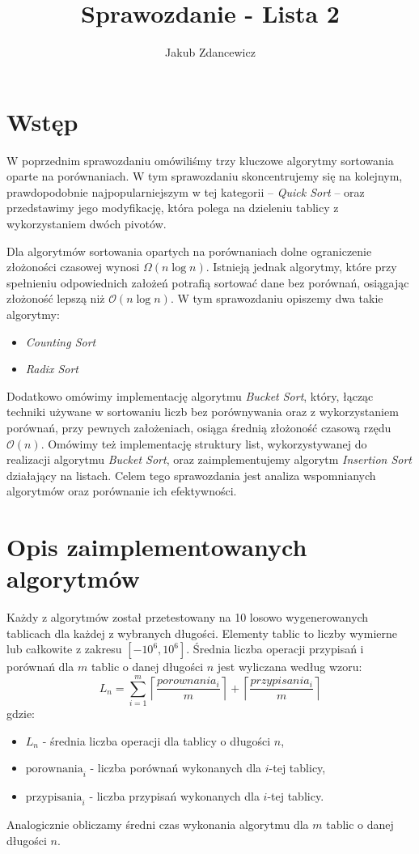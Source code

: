\documentclass{article}
\title{Sprawozdanie - Lista 2}
\author{Jakub Zdancewicz}
\date{}
\newcommand{\bigO}{\mathcal{O}}
\begin{document}
\maketitle

\tableofcontents
\newpage

\section{Wstęp}
W poprzednim sprawozdaniu omówiliśmy trzy kluczowe algorytmy sortowania oparte na porównaniach. W tym sprawozdaniu skoncentrujemy się na kolejnym, prawdopodobnie najpopularniejszym w tej kategorii – \textit{Quick Sort} – oraz przedstawimy jego modyfikację, która polega na dzieleniu tablicy z wykorzystaniem dwóch pivotów.

Dla algorytmów sortowania opartych na porównaniach dolne ograniczenie złożoności czasowej wynosi $\Omega(n \log n)$. Istnieją jednak algorytmy, które przy spełnieniu odpowiednich założeń potrafią sortować dane bez porównań, osiągając złożoność lepszą niż $\bigO(n \log n)$. W tym sprawozdaniu opiszemy dwa takie algorytmy:
\begin{itemize}
    \item \textit{Counting Sort}
    \item \textit{Radix Sort}
\end{itemize}

Dodatkowo omówimy implementację algorytmu \textit{Bucket Sort}, który, łącząc techniki używane w sortowaniu liczb bez porównywania oraz z wykorzystaniem porównań, przy pewnych założeniach, osiąga średnią złożoność czasową rzędu $\bigO(n)$. Omówimy też implementację struktury list, wykorzystywanej do realizacji algorytmu \textit{Bucket Sort}, oraz zaimplementujemy algorytm \textit{Insertion Sort} działający na listach. Celem tego sprawozdania jest analiza wspomnianych algorytmów oraz porównanie ich efektywności.
\section{Opis zaimplementowanych algorytmów}
Każdy z algorytmów został przetestowany na 10 losowo wygenerowanych tablicach dla każdej z wybranych długości. Elementy tablic to liczby wymierne lub całkowite z zakresu $[-10^6, 10^6]$. Średnia liczba operacji przypisań i porównań dla $m$ tablic o danej długości $n$ jest wyliczana według wzoru:
\[
    L_n = \sum_{i=1}^{m} \left\lceil\frac{porownania_i}{m}\right\rceil + \left\lceil\frac{przypisania_i}{m}\right\rceil
\]
gdzie:
\begin{itemize}
    \item[] $L_n$ - średnia liczba operacji dla tablicy o długości $n$,
    \item[] $\text{porownania}_i$ - liczba porównań wykonanych dla $i$-tej tablicy,
    \item[] $\text{przypisania}_i$ - liczba przypisań wykonanych dla $i$-tej tablicy.
\end{itemize}
Analogicznie obliczamy średni czas wykonania algorytmu dla $m$ tablic o danej długości $n$.
\newpage
\end{document}
